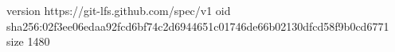 version https://git-lfs.github.com/spec/v1
oid sha256:02f3ee06edaa92fcd6bf74c2d6944651c01746de66b02130dfcd58f9b0cd6771
size 1480
